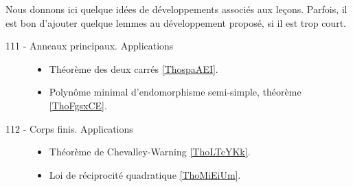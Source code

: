 Nous donnons ici quelque idées de développements associés aux leçons. Parfois, il est bon d'ajouter quelque lemmes au développement proposé, si il est trop court.

\begin{description}
    \item[111 - Anneaux principaux. Applications]
        \begin{itemize}
            \item Théorème des deux carrés \ref{ThospaAEI}.
            \item Polynôme minimal d'endomorphisme semi-simple, théorème \ref{ThoFgsxCE}.
        \end{itemize}

    \item[112 - Corps finis. Applications]
        \begin{itemize}
            \item Théorème de Chevalley-Warning \ref{ThoLTcYKk}.
            \item Loi de réciprocité quadratique \ref{ThoMiEiUm}.
        \end{itemize}
\end{description}
